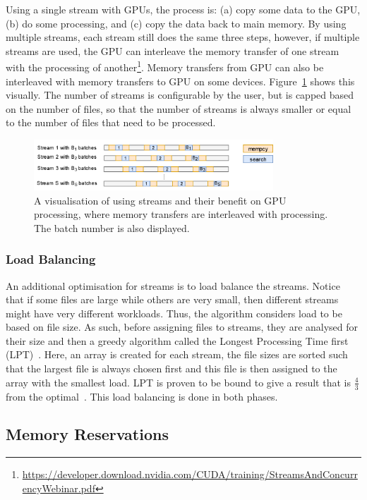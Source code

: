 Using a single stream with GPUs, the process is: (a) copy some data to the GPU, (b) do some processing, and (c) copy the data back to main memory.
By using multiple streams, each stream still does the same three steps, however, if multiple streams are used, the GPU can interleave the memory transfer of one stream with the processing of another\footnote{\url{https://developer.download.nvidia.com/CUDA/training/StreamsAndConcurrencyWebinar.pdf}}.
Memory transfers from GPU can also be interleaved with memory transfers to GPU on some devices.
Figure~\ref{fig:Streams} shows this visually.
The number of streams is configurable by the user, but is capped based on the number of files, so that the number of streams is always smaller or equal to the number of files that need to be processed.

\begin{figure}[t]
  \centering
  \includegraphics[width=0.8\textwidth]{images/Streams.png}
  \caption{A visualisation of using streams and their benefit on GPU processing, where memory transfers are interleaved with processing. The batch number is also displayed.}\label{fig:Streams}
\end{figure}

\subsubsection{Load Balancing}

An additional optimisation for streams is to load balance the streams.
Notice that if some files are large while others are very small, then different streams might have very different workloads.
Thus, the algorithm considers load to be based on file size.
As such, before assigning files to streams, they are analysed for their size and then a greedy algorithm called the Longest Processing Time first (LPT)~\cite{LPT1, LPT2}.
Here, an array is created for each stream, the file sizes are sorted such that the largest file is always chosen first and this file is then assigned to the array with the smallest load.
LPT is proven to be bound to give a result that is $\frac{4}{3}$ from the optimal~\cite{LPT2}.
This load balancing is done in both phases.

\subsection{Memory Reservations}

